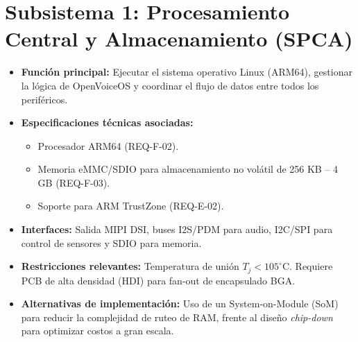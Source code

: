 \documentclass[%
	paper=a4,
	twoside=false,
	parskip=half,
	chapterprefix=false,
	10pt,
	headings=normal,
	bibliography=totoc,
	listof=totoc,
	titlepage=on,
	captions=tableabove,
	draft=false,
]{scrbook}%
\begin{document}
\section{Subsistema 1: Procesamiento Central y Almacenamiento (SPCA)}
\begin{itemize}
    \item \textbf{Función principal:} Ejecutar el sistema operativo Linux (ARM64), gestionar la lógica de OpenVoiceOS y coordinar el flujo de datos entre todos los periféricos.
    \item \textbf{Especificaciones técnicas asociadas:}
        \begin{itemize}
            \item Procesador ARM64 (REQ-F-02).
            \item Memoria eMMC/SDIO para almacenamiento no volátil de 256 KB – 4 GB (REQ-F-03).
            \item Soporte para ARM TrustZone (REQ-E-02).
        \end{itemize}
    \item \textbf{Interfaces:} Salida MIPI DSI, buses I2S/PDM para audio, I2C/SPI para control de sensores y SDIO para memoria.
    \item \textbf{Restricciones relevantes:} Temperatura de unión $T_j < 105^\circ$C. Requiere PCB de alta densidad (HDI) para fan-out de encapsulado BGA.
    \item \textbf{Alternativas de implementación:} Uso de un System-on-Module (SoM) para reducir la complejidad de ruteo de RAM, frente al diseño \textit{chip-down} para optimizar costos a gran escala.
\end{itemize}
\end{document}
